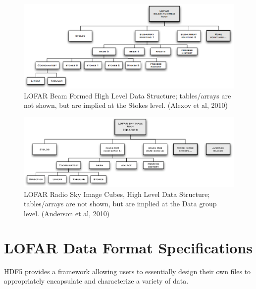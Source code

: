 \documentclass{PoS}
\begin{document}
\begin{figure}[htbp]
  \centering
  \includegraphics[scale=0.52]{BFschematic.eps}
  \caption{LOFAR Beam Formed High Level Data Structure; tables/arrays are not shown, but are implied at the Stokes level. (Alexov et al, 2010)}
  \label{fig:bfhighlev}
\end{figure}

\begin{figure}[htbp]
  \centering
  \includegraphics[scale=0.52]{SkyImDiag4.eps}
  \caption{LOFAR Radio Sky Image Cubes, High Level Data Structure; tables/arrays are not shown, but are implied at the Data group level. (Anderson et al, 2010)}
  \label{fig:bfhighlev}
\end{figure}

\section{LOFAR Data Format Specifications}
HDF5 provides a framework allowing users to essentially design their
own files to  appropriately encapsulate and characterize a variety of data.
\end{document}

